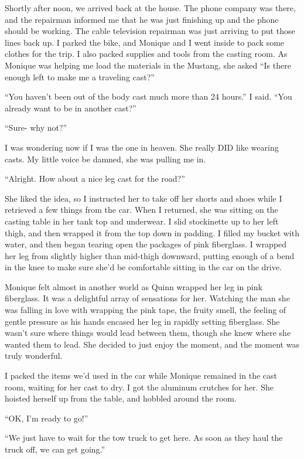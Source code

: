 Shortly after noon, we arrived back at the house. The phone company was there, and the
repairman informed me that he was just finishing up and the phone should be working. The cable
television repairman was just arriving to put those lines back up. I parked the bike, and
Monique and I went inside to pack some clothes for the trip. I also packed supplies and tools
from the casting room. As Monique was helping me load the materials in the Mustang, she asked
``Is there enough left to make me a traveling cast?''

``You haven't been out of the body cast much more than 24 hours.'' I said. ``You already want
to be in another cast?''

``Sure- why not?''

I was wondering now if I was the one in heaven. She really DID like wearing casts. My
little voice be damned, she was pulling me in.

``Alright. How about a nice leg cast for the road?''

She liked the idea, so I instructed her to take off her shorts and shoes while I retrieved
a few things from the car. When I returned, she was sitting on the casting table in her tank top
and underwear. I slid stockinette up to her left thigh, and then wrapped it from the top down in
padding. I filled my bucket with water, and then began tearing open the packages of pink
fiberglass. I wrapped her leg from slightly higher than mid-thigh downward, putting enough of a
bend in the knee to make sure she'd be comfortable sitting in the car on the drive.

\begin{thought}
Monique felt almost in another world as Quinn wrapped her leg in pink fiberglass. It was a
delightful array of sensations for her. Watching the man she was falling in love with wrapping
the pink tape, the fruity smell, the feeling of gentle pressure as his hands encased her leg in
rapidly setting fiberglass. She wasn't sure where things would lead between them, though she
knew where she wanted them to lead. She decided to just enjoy the moment, and the moment was
truly wonderful.
\end{thought}

I packed the items we'd used in the car while Monique remained in the cast room, waiting
for her cast to dry. I got the aluminum crutches for her. She hoisted herself up from the table,
and hobbled around the room.

``OK, I'm ready to go!''

``We just have to wait for the tow truck to get here. As soon as they haul the truck off, we
can get going.''

